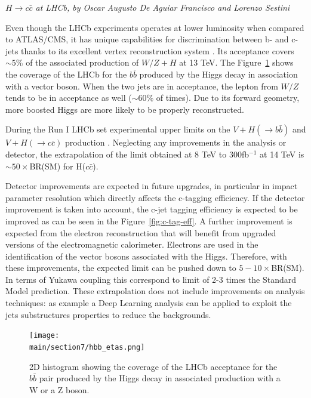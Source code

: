\documentclass[../report.tex]{subfiles}
\providecommand{\main}{..}
\begin{document}
\begin{center}{\emph{$H \rightarrow c \bar{c}$ at LHCb, by Oscar Augusto De Aguiar Francisco and Lorenzo Sestini}} \end{center}

Even though the LHCb experiments operates at lower luminosity when compared to ATLAS/CMS, it has unique capabilities for discrimination between b- and c-jets thanks to its excellent vertex reconstruction system \cite{Aaij:2015yqa}. Its acceptance covers $\sim 5$\% of the associated production of $W/Z+H$ at 13 TeV. The Figure~\ref{fig:hbbetas} shows the coverage of the LHCb for the $b\bar{b}$ produced by the Higgs decay in association with a vector boson. When the two jets are in acceptance, the lepton from $W/Z$ tends to be in acceptance as well ($\sim 60$\% of times). Due to its forward geometry, more boosted Higgs are more likely to be properly reconstructed.

During the Run I LHCb set experimental upper limits on the $V+H(\rightarrow b \bar{b})$ and $V+H(\rightarrow c \bar{c})$ production \cite{LHCb:2016yxg}.
Neglecting any improvements in the analysis or detector, the extrapolation of the limit obtained at 8 TeV to 300fb$^{-1}$ at 14 TeV is $\sim 50\times$BR(SM) for H($c\bar{c}$). 

Detector improvements are expected in future upgrades, in particular in impact parameter resolution which directly affects the c-tagging efficiency. 
If the detector improvement is taken into account, the c-jet tagging efficiency is expected to be improved as can be seen in the Figure~\ref{fig:c-tag-eff}.  
A further improvement is expected from the electron reconstruction that will benefit from upgraded versions of the electromagnetic calorimeter. Electrons are used in the identification of the vector bosons associated with the Higgs.
Therefore, with these improvements, the expected limit can be pushed down to $5-10\times$BR(SM).
In terms of Yukawa coupling this correspond to limit of 2-3 times the Standard Model prediction.
These extrapolation does not include improvements on analysis techniques: as example a Deep Learning analysis can be applied to exploit the jets substructures properties to reduce the backgrounds.

\begin{figure}[ht]
	\centering
	\texttt{[image: \\main/section7/hbb\_etas.png]}
	\caption{2D histogram showing the coverage of the LHCb acceptance for the $b\bar{b}$ pair produced by the Higgs decay in associated production with a W or a Z boson.}
	\label{fig:hbbetas}
\end{figure}
\end{document}
